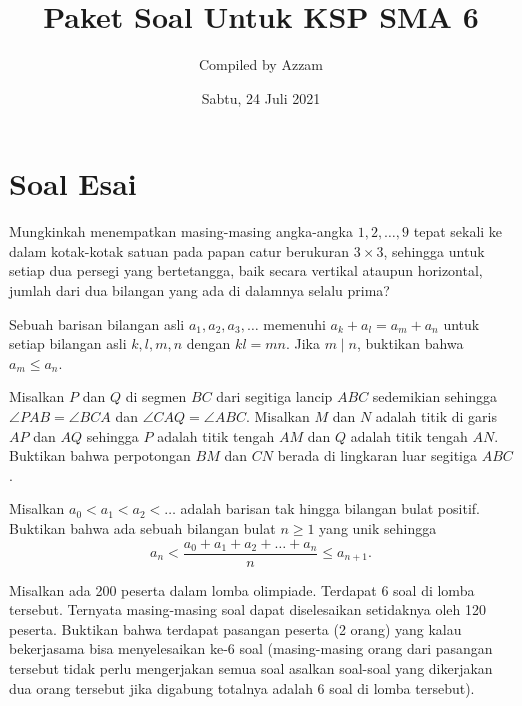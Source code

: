 \documentclass[11pt]{scrartcl}
\begin{document}
	\title{Paket Soal Untuk KSP SMA 6} %
	\date{Sabtu, 24 Juli 2021}
	\author{Compiled by Azzam}
	\maketitle
	
	
	\section{Soal Esai}
	
	\begin{soalbaru} 
			Mungkinkah menempatkan masing-masing angka-angka $1,2,\dots,9$ tepat sekali ke dalam kotak-kotak satuan pada papan catur berukuran $3\times 3$, sehingga untuk setiap dua persegi yang bertetangga, baik secara vertikal ataupun horizontal, jumlah dari dua bilangan yang ada di dalamnya selalu prima?
		\end{soalbaru}
		
		
		\begin{soalbaru}
				Sebuah barisan bilangan asli $a_1,a_2,a_3,\dots$ memenuhi $a_k+a_l=a_m+a_n$ untuk setiap bilangan asli $k,l,m,n$ dengan $kl=mn$. Jika $m\mid n$, buktikan bahwa $a_m \le a_n$.
			\end{soalbaru}

	\begin{soalbaru}
		Misalkan $P$ dan $Q$ di segmen $BC$ dari segitiga lancip $ABC$ sedemikian sehingga $\angle PAB = \angle BCA$ dan $\angle CAQ = \angle ABC$. Misalkan $M$ dan $N$ adalah titik di garis $AP$ dan $AQ$ sehingga $P$ adalah titik tengah $AM$ dan $Q$ adalah titik tengah $AN$. Buktikan bahwa perpotongan $BM$ dan $CN$ berada di lingkaran luar segitiga $ABC$.
	\end{soalbaru}

	\begin{soalbaru}
		Misalkan $a_0 < a_1 < a_2 < \dots$ adalah barisan tak hingga bilangan bulat positif. Buktikan bahwa ada sebuah bilangan bulat $n \ge 1$ yang unik sehingga $$a_n < \dfrac{a_0+a_1+a_2+\dots+a_n}{n} \le a_{n+1}.$$
	\end{soalbaru}

	
	\begin{soalbaru}
	Misalkan ada 200 peserta dalam lomba olimpiade. Terdapat 6 soal di lomba tersebut. Ternyata masing-masing soal dapat diselesaikan setidaknya oleh 120 peserta.
	Buktikan bahwa terdapat pasangan peserta (2 orang) yang kalau bekerjasama bisa menyelesaikan ke-6 soal (masing-masing orang dari pasangan tersebut tidak perlu mengerjakan semua soal asalkan soal-soal yang dikerjakan dua orang tersebut jika digabung totalnya adalah 6 soal di lomba tersebut).
	\end{soalbaru}

	
\end{document}
